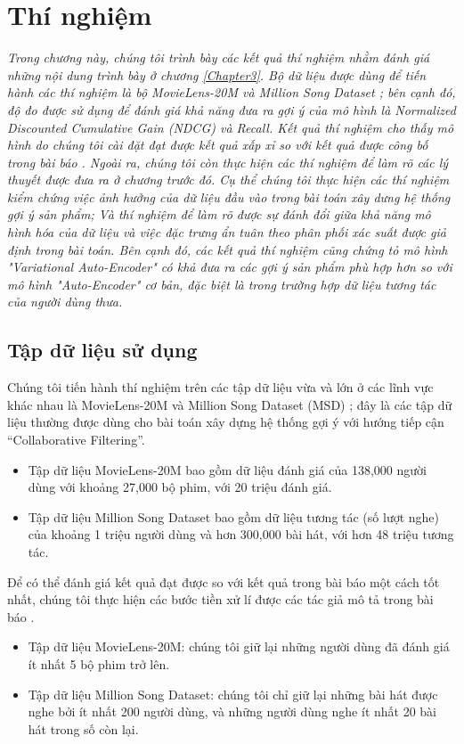 \chapter{Thí nghiệm}
\justifying

\setlength{\parindent}{6.5ex}
\label{Chapter4}
\graphicspath{{Chapter4/Chapter4Figs}}
\textit{Trong chương này, chúng tôi trình bày các kết quả thí nghiệm nhằm đánh giá những nội dung trình bày ở chương \ref{Chapter3}. Bộ dữ liệu được dùng để tiến hành các thí nghiệm là bộ MovieLens-20M \cite{Ml20M} và Million Song Dataset \cite{MSD}; bên cạnh đó, độ đo được sử dụng để đánh giá khả năng đưa ra gợi ý của mô hình là Normalized Discounted Cumulative Gain (NDCG) và  Recall. Kết quả thí nghiệm cho thấy mô hình do chúng tôi cài đặt đạt được kết quả xấp xỉ so với kết quả được công bố trong bài báo \cite{mvae}. 
Ngoài ra, chúng tôi còn thực hiện các thí nghiệm     để làm rõ các lý thuyết được đưa ra ở chương trước đó.
Cụ thể chúng tôi thực hiện các thí nghiệm kiểm chứng việc ảnh hưởng của dữ liệu đầu vào trong bài toán xây dưng hệ thống gợi ý sản phẩm;
Và thí nghiệm để làm rõ được sự đánh đổi giữa khả năng mô hình hóa của dữ liệu và việc đặc trưng ẩn tuân theo phân phối xác suất được giả định trong bài toán. 
Bên cạnh đó, các kết quả thí nghiệm cũng chứng tỏ mô hình "Variational Auto-Encoder" có khả đưa ra các gợi ý sản phẩm phù hợp hơn so với mô hình "Auto-Encoder" cơ bản, đặc biệt là trong trường hợp dữ liệu tương tác của người dùng thưa.
}


\section{Tập dữ liệu sử dụng}
\label{chap4sec1}
Chúng tôi tiến hành thí nghiệm trên các tập dữ liệu vừa và lớn ở các lĩnh vực khác nhau là MovieLens-20M \cite{Ml20M} 
và Million Song Dataset (MSD) \cite{MSD}; đây là các tập dữ liệu thường được dùng cho bài toán xây dựng hệ thống gợi ý
với hướng tiếp cận ``Collaborative Filtering''. 
\begin{itemize}
    \item Tập dữ liệu MovieLens-20M bao gồm dữ liệu đánh giá của 138,000 người dùng với khoảng 27,000 bộ phim,
    với 20 triệu đánh giá.
    \item Tập dữ liệu Million Song Dataset bao gồm dữ liệu tương tác (số lượt nghe) của khoảng 1 triệu người dùng và hơn 300,000 bài hát, với hơn 48 triệu tương tác.
\end{itemize}

Để có thể đánh giá kết quả đạt được so với kết quả trong bài báo \cite{mvae} một cách tốt nhất,
chúng tôi thực hiện các bước tiền xử lí được các tác giả mô tả trong bài báo \cite{mvae}.
\begin{itemize}
    \item Tập dữ liệu MovieLens-20M: chúng tôi giữ lại những người dùng đã đánh giá ít nhất 5 bộ phim trở lên. 
    \item Tập dữ liệu Million Song Dataset: chúng tôi chỉ giữ lại những bài hát được nghe bởi ít nhất 200 người dùng, và những người dùng nghe ít nhất 20 bài hát trong số còn lại.
\end{itemize}

